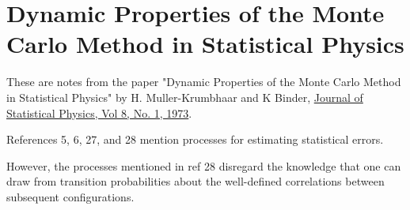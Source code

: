 \section{Dynamic Properties of the Monte Carlo Method in Statistical Physics}

These are notes from the paper
"Dynamic Properties of the Monte Carlo Method in Statistical Physics"
by H. Muller-Krumbhaar and K Binder,
\href{https://link.springer.com/article/10.1007/BF01008440}{Journal of Statistical Physics, Vol 8, No. 1, 1973}.

References 5, 6, 27, and 28 mention processes for estimating statistical errors.

However, the processes mentioned in ref 28 disregard the knowledge that one can draw from
transition probabilities about the well-defined correlations between subsequent configurations.